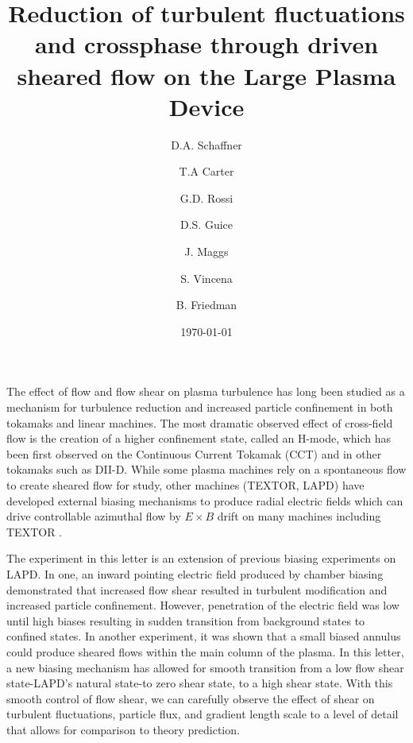 \documentclass[%
 aip,
 amsmath,amssymb,
 preprint,%
]{revtex4-1}
\begin{document}
\title{Reduction of turbulent fluctuations and crossphase through driven sheared flow on the Large Plasma Device}

\author{D.A. Schaffner}
\author{T.A Carter}
\author{G.D. Rossi}
\author{D.S. Guice}
\author{J. Maggs}
\author{S. Vincena}
\author{B. Friedman}

\date{\today}%


\maketitle



The effect of flow and flow shear on plasma turbulence has long been studied as a mechanism for turbulence reduction and increased particle confinement in both tokamaks and linear machines.  The most dramatic observed effect of cross-field flow is the creation of a higher confinement state, called an H-mode, which has been first observed on the Continuous Current Tokamak (CCT) and in other tokamaks such as DII-D. While some plasma machines rely on a spontaneous flow to create sheared flow for study, other machines (TEXTOR, LAPD) have developed external biasing mechanisms to produce radial electric fields which can drive controllable azimuthal flow by $E \times B$ drift on many machines including TEXTOR \cite{boedo00}.

The experiment in this letter is an extension of previous biasing experiments on LAPD. In one, an inward pointing electric field produced by chamber biasing demonstrated that increased flow shear resulted in turbulent modification and increased particle confinement\cite{carter09}. However, penetration of the electric field was low until high biases resulting in sudden transition from background states to confined states. In another experiment, it was shown that a small biased annulus could produce sheared flows within the main column of the plasma\cite{zhou12}. In this letter, a new biasing mechanism has allowed for smooth transition from a low flow shear state-LAPD's natural state-to zero shear state, to a high shear state. With this smooth control of flow shear, we can carefully observe the effect of shear on turbulent fluctuations, particle flux, and gradient length scale to a level of detail that allows for comparison to theory prediction.
\end{document}
